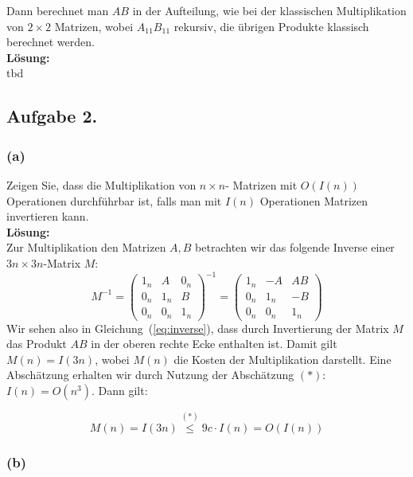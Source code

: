 \documentclass[11pt,a4paper,ngerman]{article}
\begin{document}
Dann berechnet man $AB$ in der Aufteilung, wie bei der klassischen Multiplikation von $2\times 2$ Matrizen, wobei $A_{11}B_{11}$ rekursiv, die übrigen Produkte klassisch berechnet werden.\\

\textbf{Lösung:}\\

tbd

\subsection*{Aufgabe 2.}

\subsubsection*{(a)}

Zeigen Sie, dass die Multiplikation von $n \times n$- Matrizen mit $O(I(n))$ Operationen durchführbar ist, falls man mit $I(n)$ Operationen Matrizen invertieren kann.\\

\textbf{Lösung:}\\
Zur Multiplikation den Matrizen $A,B$ betrachten wir das folgende Inverse einer $3n \times 3n$-Matrix $M$:
\begin{equation}\label{eq:inverse}
  M^{-1} = \left(\begin{array}{ccc}
              1_n & A   & 0_n \\
              0_n & 1_n & B \\
              0_n & 0_n & 1_n
           \end{array}\right)^{-1}
         = \left(\begin{array}{ccc}
              1_n & -A   & AB \\
              0_n & 1_n & -B \\
              0_n & 0_n & 1_n
           \end{array}\right)
\end{equation}
Wir sehen also in Gleichung~(\ref{eq:inverse}), dass durch Invertierung der Matrix $M$ das Produkt $AB$
in der oberen rechte Ecke enthalten ist. Damit gilt $M(n) = I(3n)$, wobei $M(n)$ die Kosten der Multiplikation
darstellt.
Eine Abschätzung erhalten wir durch Nutzung der Abschätzung $(*)$: $I(n) = O(n^3)$. Dann gilt:

\begin{equation}
  M(n) = I(3n) \stackrel{(*)}{\leq} 9c\cdot I(n) = O(I(n))
\end{equation}
\subsubsection*{(b)}
\end{document}
